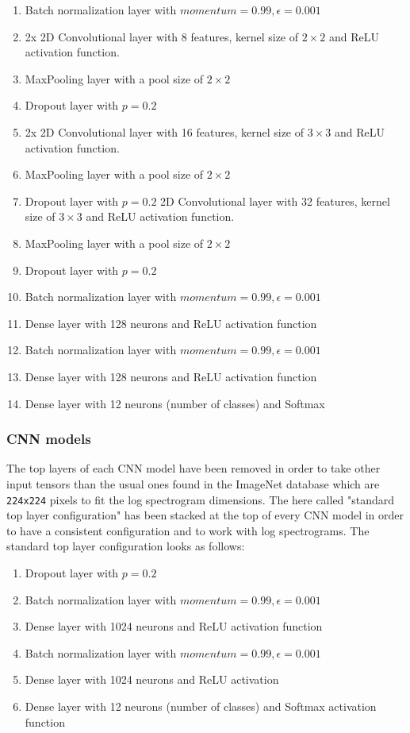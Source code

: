 \documentclass{article}
\theoremstyle{definition}
\theoremstyle{remark}
\begin{document}
\begin{enumerate}
		\item Batch normalization layer with $momentum=0.99, \epsilon=0.001$
		\item 2x 2D Convolutional layer with 8 features, kernel size of $2 \times 2$ and ReLU activation function.
		\item MaxPooling layer with a pool size of $2 \times 2$
		\item Dropout layer with $p = 0.2$
		\item 2x 2D Convolutional layer with 16 features, kernel size of $3 \times 3$ and ReLU activation function.
		\item MaxPooling layer with a pool size of $2 \times 2$
		\item Dropout layer with $p = 0.2$
		2D Convolutional layer with 32 features, kernel size of $3 \times 3$ and ReLU activation function.
			\item MaxPooling layer with a pool size of $2 \times 2$
			\item Dropout layer with $p = 0.2$
		\item Batch normalization layer with $momentum=0.99, \epsilon=0.001$
			\item Dense layer with 128 neurons and ReLU activation function
		\item Batch normalization layer with $momentum=0.99, \epsilon=0.001$
		\item Dense layer with 128 neurons and ReLU activation function
		\item Dense layer with 12 neurons (number of classes) and Softmax
		
\end{enumerate}


\subsubsection{CNN models} \label{cnn_models}

The top layers of each CNN model have been removed in order to take other input tensors than the usual ones found in the ImageNet database which are \texttt{224x224} pixels to fit the log spectrogram dimensions. The here called "standard top layer configuration" has been stacked at the top of every CNN model in order to have a consistent configuration and to work with log spectrograms. The standard top layer configuration looks as follows:

\begin{enumerate}
	\item Dropout layer with $p = 0.2$
	\item Batch normalization layer with $momentum=0.99, \epsilon=0.001$
	\item Dense layer with 1024 neurons and ReLU activation function
	\item Batch normalization layer with $momentum=0.99, \epsilon=0.001$
	\item Dense layer with 1024 neurons and ReLU activation
	\item Dense layer with 12 neurons (number of classes) and Softmax activation function
\end{enumerate}
\end{document}
